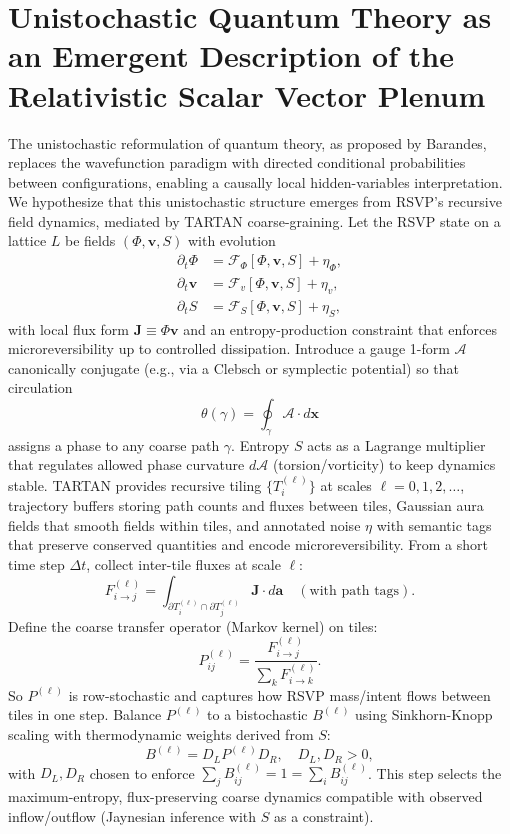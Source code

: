 \documentclass[11pt]{article}
\theoremstyle{plain}
\theoremstyle{definition}
\begin{document}
\section{Unistochastic Quantum Theory as an Emergent Description of the Relativistic Scalar Vector Plenum}
The unistochastic reformulation of quantum theory, as proposed by Barandes, replaces the wavefunction paradigm with directed conditional probabilities between configurations, enabling a causally local hidden-variables interpretation. We hypothesize that this unistochastic structure emerges from RSVP's recursive field dynamics, mediated by TARTAN coarse-graining.
Let the RSVP state on a lattice $L$ be fields $(\Phi,\bm{v},S)$ with evolution
\begin{align}
\partial_t \Phi &= \mathcal{F}_\Phi[\Phi,\bm{v},S] + \eta_\Phi, \\
\partial_t \bm{v} &= \mathcal{F}_v[\Phi,\bm{v},S] + \eta_v, \\
\partial_t S &= \mathcal{F}_S[\Phi,\bm{v},S] + \eta_S,
\end{align}
with local flux form $\bm{J} \equiv \Phi \bm{v}$ and an entropy-production constraint that enforces microreversibility up to controlled dissipation. Introduce a gauge 1-form $\mathcal{A}$ canonically conjugate (e.g., via a Clebsch or symplectic potential) so that circulation
\[
\theta(\gamma) = \oint_\gamma \mathcal{A} \cdot d\bm{x}
\]
assigns a phase to any coarse path $\gamma$. Entropy $S$ acts as a Lagrange multiplier that regulates allowed phase curvature $d\mathcal{A}$ (torsion/vorticity) to keep dynamics stable.
TARTAN provides recursive tiling $\{T_i^{(\ell)}\}$ at scales $\ell = 0,1,2,\dots$, trajectory buffers storing path counts and fluxes between tiles, Gaussian aura fields that smooth fields within tiles, and annotated noise $\eta$ with semantic tags that preserve conserved quantities and encode microreversibility.
From a short time step $\Delta t$, collect inter-tile fluxes at scale $\ell$:
\[
F_{i\to j}^{(\ell)} = \int_{\partial T_i^{(\ell)} \cap \partial T_j^{(\ell)}} \bm{J} \cdot d\bm{a} \quad (\text{with path tags}).
\]
Define the coarse transfer operator (Markov kernel) on tiles:
\[
P_{ij}^{(\ell)} = \frac{F_{i\to j}^{(\ell)}}{\sum_k F_{i\to k}^{(\ell)}}.
\]
So $P^{(\ell)}$ is row-stochastic and captures how RSVP mass/intent flows between tiles in one step.
Balance $P^{(\ell)}$ to a bistochastic $B^{(\ell)}$ using Sinkhorn-Knopp scaling with thermodynamic weights derived from $S$:
\[
B^{(\ell)} = D_L P^{(\ell)} D_R, \quad D_L, D_R > 0,
\]
with $D_L, D_R$ chosen to enforce $\sum_j B_{ij}^{(\ell)} = 1 = \sum_i B_{ij}^{(\ell)}$. This step selects the maximum-entropy, flux-preserving coarse dynamics compatible with observed inflow/outflow (Jaynesian inference with $S$ as a constraint).
\end{document}
